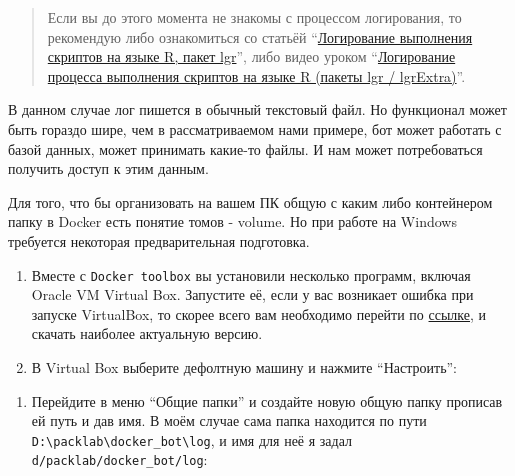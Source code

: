 \documentclass[
]{book}
\newenvironment{Shaded}{\begin{snugshade}}{\end{snugshade}}
\newcommand{\AttributeTok}[1]{\textcolor[rgb]{0.13,0.29,0.53}{#1}}
\newcommand{\CommentTok}[1]{\textcolor[rgb]{0.56,0.35,0.01}{\textit{#1}}}
\newcommand{\FunctionTok}[1]{\textcolor[rgb]{0.13,0.29,0.53}{\textbf{#1}}}
\newcommand{\NormalTok}[1]{#1}
\newcommand{\OtherTok}[1]{\textcolor[rgb]{0.56,0.35,0.01}{#1}}
\newcommand{\SpecialCharTok}[1]{\textcolor[rgb]{0.81,0.36,0.00}{\textbf{#1}}}
\newcommand{\StringTok}[1]{\textcolor[rgb]{0.31,0.60,0.02}{#1}}
\providecommand{\tightlist}{%
  \setlength{\itemsep}{0pt}\setlength{\parskip}{0pt}}
\begin{document}
\begin{Shaded}
\end{Shaded}

\begin{quote}
Если вы до этого момента не знакомы с процессом логирования, то рекомендую либо ознакомиться со статьёй ``\href{https://habr.com/ru/post/529118/}{Логирование выполнения скриптов на языке R, пакет lgr}'', либо видео уроком ``\href{https://www.youtube.com/watch?v=xA8YGxQH1Ws}{Логирование процесса выполнения скриптов на языке R (пакеты lgr / lgrExtra)}''.
\end{quote}

В данном случае лог пишется в обычный текстовый файл. Но функционал может быть гораздо шире, чем в рассматриваемом нами примере, бот может работать с базой данных, может принимать какие-то файлы. И нам может потребоваться получить доступ к этим данным.

Для того, что бы организовать на вашем ПК общую с каким либо контейнером папку в Docker есть понятие томов - volume. Но при работе на Windows требуется некоторая предварительная подготовка.

\begin{enumerate}
\def\labelenumi{\arabic{enumi}.}
\tightlist
\item
  Вместе с \texttt{Docker\ toolbox} вы установили несколько программ, включая Oracle VM Virtual Box. Запустите её, если у вас возникает ошибка при запуске VirtualBox, то скорее всего вам необходимо перейти по \href{https://www.virtualbox.org/wiki/Downloads}{ссылке}, и скачать наиболее актуальную версию.
\item
  В Virtual Box выберите дефолтную машину и нажмите ``Настроить'':
\end{enumerate}

\begin{enumerate}
\def\labelenumi{\arabic{enumi}.}
\setcounter{enumi}{2}
\tightlist
\item
  Перейдите в меню ``Общие папки'' и создайте новую общую папку прописав ей путь и дав имя. В моём случае сама папка находится по пути \texttt{D:\textbackslash{}packlab\textbackslash{}docker\_bot\textbackslash{}log}, и имя для неё я задал \texttt{d/packlab/docker\_bot/log}:
\end{enumerate}
\end{document}
